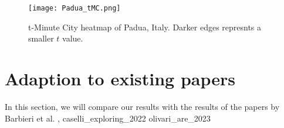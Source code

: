\begin{figure}[htbp]
    \centering
    \texttt{[image: Padua\_tMC.png]}
    \caption{t-Minute City heatmap of Padua, Italy. Darker edges represnts a smaller $t$ value.}
    \label{fig:padua_tMC}
\end{figure}

\section{Adaption to existing papers}

In this section, we will compare our results with the results of the papers by Barbieri et al. \cite{barbieri_graph_2023}, caselli_exploring_2022 olivari_are_2023


